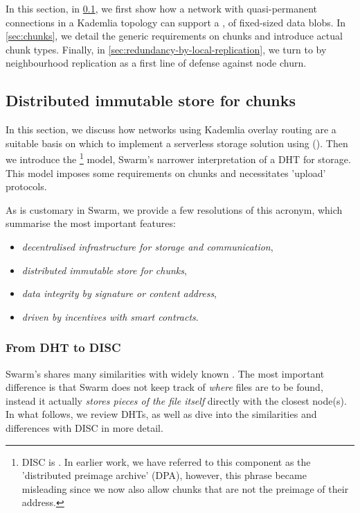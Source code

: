 In this section, in \ref{sec:disc}, we first show how a network with quasi-permanent connections in a Kademlia topology can support a ,  of fixed-sized data blobs. In \ref{sec:chunks}, we detail the generic requirements on chunks and introduce actual chunk types. Finally, in \ref{sec:redundancy-by-local-replication}, we turn to  by neighbourhood replication as a first line of defense against node churn.

\subsection{Distributed immutable store for chunks\statusgreen}\label{sec:disc}
 
In this section, we discuss how networks using Kademlia overlay routing are a suitable basis on which to implement a serverless storage solution using  (). Then we introduce the %
%
\footnote{DISC is . In earlier work, we have referred to this component as the 'distributed preimage archive' (DPA), however, this phrase became misleading since we now also allow chunks that are not the preimage of their address.}
% 
model, Swarm's narrower interpretation of a DHT for storage. This model 
imposes some requirements on chunks and necessitates 'upload' protocols. 

As is customary in Swarm, we provide a few resolutions of this acronym, which summarise the most important features:


\begin{itemize}
\item \emph{decentralised infrastructure for storage and communication}, 
\item \emph{distributed immutable store for chunks}, 
\item \emph{data integrity by signature or content address},
\item \emph{driven by incentives with smart contracts}. 

\end{itemize}
 
\subsubsection{From DHT to DISC}
Swarm's  shares many similarities with widely known . The most important difference is that Swarm does not keep track of \emph{where} files are to be found, instead it actually \emph{stores pieces of the file itself} directly with the closest node(s). 
In what follows, we review DHTs, as well as dive into the similarities and differences with DISC in more detail. 
 
